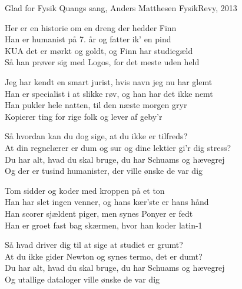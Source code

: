 \begin{song}{Glad for Fysik}
  {} %
  {Quangs sang, Anders Matthesen} %
  {} %
  {FysikRevy, 2013} %
  {\NotCCLIed} %

  \begin{SBVerse}
	Her er en historie om en dreng der hedder Finn\\
	Han er humanist på 7. år  og fatter ik' en pind\\
	KUA det er mørkt og goldt, og Finn har studiegæld\\
	Så han prøver sig med Logos, for det meste uden held
  \end{SBVerse}

  \begin{SBVerse}
	Jeg har kendt en smart jurist, hvis navn jeg nu har glemt\\
	Han er specialist i at slikke røv, og han har det ikke nemt\\
	Han pukler hele natten, til den næste morgen gryr\\
	Kopierer ting for rige folk og lever af geby'r
  \end{SBVerse}

  \begin{SBChorus}
	Så hvordan kan du dog sige, at du ikke er tilfreds?\\
	At din regnelærer er dum og sur og dine lektier gi'r dig stress?\\
	Du har alt, hvad du skal bruge, du har Schuams og hævegrej\\
	Og der er tusind humanister, der ville ønske de var dig
  \end{SBChorus}

  \begin{SBVerse}
	Tom sidder og koder med kroppen på et ton\\
	Han har slet ingen venner, og hans kær'ste er hans hånd\\
	Han scorer sjældent piger, men synes Ponyer er fedt\\
	Han er groet fast bag skærmen, hvor han koder latin-1
  \end{SBVerse}

  \begin{SBChorus}
	Så hvad driver dig til at sige at studiet er grumt?\\
	At du ikke gider Newton og synes termo, det er dumt?\\
	Du har alt, hvad du skal bruge, du har Schuams og hævegrej\\
	Og utallige dataloger ville ønske de var dig
  \end{SBChorus}
\end{song}